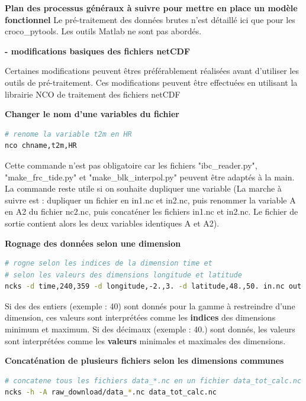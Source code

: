 \documentclass[10pt,a4paper,titlepage]{article}
\begin{document}
\begin{processEnv}{\textbf{Plan des processus généraux à suivre pour mettre en place un modèle fonctionnel}}
    Le pré-traitement des données brutes n'est détaillé ici que pour les croco\_pytools. Les outils Matlab ne sont pas abordés.

    \textbf{- modifications basiques des fichiers netCDF}

    Certaines modifications peuvent êtres préférablement réalisées avant d'utiliser les outils de pré-traitement. Ces modifications peuvent être effectuées en utilisant la librairie NCO de traitement des fichiers netCDF

    \begin{codeEnv}{\textbf{Changer le nom d'une variables du fichier}}
\begin{lstlisting}[language=bash]
# renome la variable t2m en HR
nco chname,t2m,HR
\end{lstlisting}
    \end{codeEnv}

    Cette commande n'est pas obligatoire car les fichiers "ibc\_reader.py", "make\_frc\_tide.py" et "make\_blk\_interpol.py" peuvent être adaptés à la main.
    La commande reste utile si on souhaite dupliquer une variable (La marche à suivre est : dupliquer un fichier en in1.nc et in2.nc, puis renommer la variable A en A2 du fichier nc2.nc, puis concaténer les fichiers in1.nc et in2.nc. Le fichier de sortie contient alors les deux variables identiques A et A2).

    \begin{codeEnv}{\textbf{Rognage des données selon une dimension}}
\begin{lstlisting}[language=bash]
# rogne selon les indices de la dimension time et
# selon les valeurs des dimensions longitude et latitude
ncks -d time,240,359 -d longitude,-2.,3. -d latitude,48.,50. in.nc out.nc
\end{lstlisting}
    \end{codeEnv}

    Si des des entiers (exemple : 40) sont donnés pour la gamme à restreindre d'une dimension, ces valeurs sont interprétées comme les \textbf{indices} des dimensions minimum et maximum. Si des décimaux (exemple : 40.) sont donnés, les valeurs sont interprétées comme les \textbf{valeurs }minimales et maximales des dimensions.

    \begin{codeEnv}{\textbf{Concaténation de plusieurs fichiers selon les dimensions communes}}
\begin{lstlisting}[language=bash]
# concatene tous les fichiers data_*.nc en un fichier data_tot_calc.nc
ncks -h -A raw_download/data_*.nc data_tot_calc.nc
\end{lstlisting}
    \end{codeEnv}


\end{processEnv}
\end{document}
